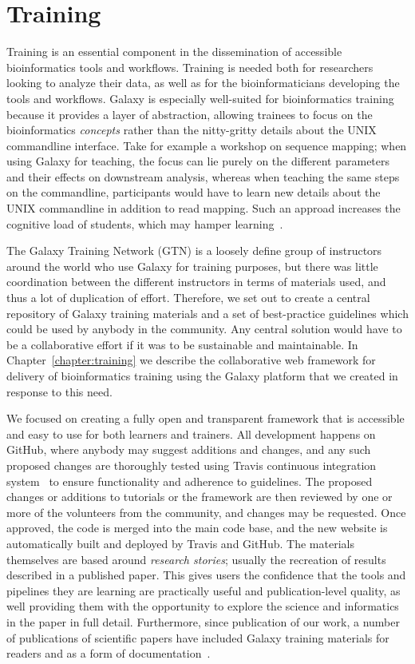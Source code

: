 \section{Training}
Training is an essential component in the dissemination of accessible bioinformatics tools and workflows. Training is needed both for researchers looking to analyze their data, as well as for the bioinformaticians developing the tools and workflows. Galaxy is especially well-suited for bioinformatics training because it provides a layer of abstraction, allowing trainees to focus on the bioinformatics \emph{concepts} rather than the nitty-gritty details about the UNIX commandline interface. Take for example a workshop on sequence mapping; when using Galaxy for teaching, the focus can lie purely on the different parameters and their effects on downstream analysis, whereas when teaching the same steps on the commandline, participants would have to learn new details about the UNIX commandline in addition to read mapping. Such an approad increases the cognitive load of students, which may hamper learning~\cite{paas2003cognitive}.

The Galaxy Training Network (GTN) is a loosely define group of instructors around the world who use Galaxy for training purposes, but there was little coordination between the different instructors in terms of materials used, and thus a lot of duplication of effort. Therefore, we set out to create a central repository of Galaxy training materials and a set of best-practice guidelines which could be used by anybody in the community. Any central solution would have to be a collaborative effort if it was to be sustainable and maintainable. In Chapter~\ref{chapter:training} we describe the collaborative web framework for delivery of bioinformatics training using the Galaxy platform that we created in response to this need.

We focused on creating a fully open and transparent framework that is accessible and easy to use for both learners and trainers. All development happens on GitHub, where anybody may suggest additions and changes, and any such proposed changes are thoroughly tested using Travis continuous integration system~\cite{travis-ci} to ensure functionality and adherence to guidelines. The proposed changes or additions to tutorials or the framework are then reviewed by one or more of the volunteers from the community, and changes may be requested. Once approved, the code is merged into the main code base, and the new website is automatically built and deployed by Travis and GitHub. The materials themselves are based around \emph{research stories}; usually the recreation of results described in a published paper. This gives users the confidence that the tools and pipelines they are learning are practically useful and publication-level quality, as well providing them with the opportunity to explore the science and informatics in the paper in full detail. Furthermore, since publication of our work, a number of publications of scientific papers have included Galaxy training materials for readers and as a form of documentation~\cite{TODO}.

